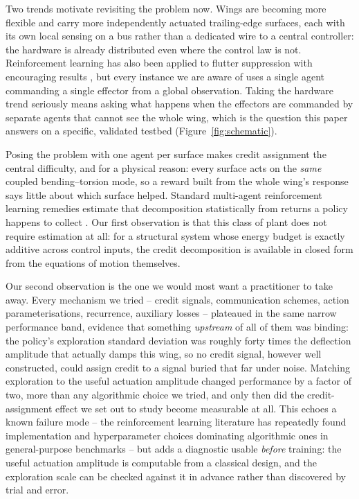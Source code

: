 \documentclass[journal]{new-aiaa}
\begin{document}
Two trends motivate revisiting the problem now. Wings are becoming more
flexible and carry more independently actuated trailing-edge surfaces, each
with its own local sensing on a bus rather than a dedicated wire to a
central controller: the hardware is already distributed even where the
control law is not. Reinforcement learning has also been applied to flutter
suppression with encouraging results
\cite{circulation2023,stallflutter2025,flyingwing2022}, but every instance
we are aware of uses a single agent commanding a single effector from a
global observation. Taking the hardware trend seriously means asking what
happens when the effectors are commanded by separate agents that cannot see
the whole wing, which is the question this paper answers on a specific,
validated testbed (Figure~\ref{fig:schematic}).

Posing the problem with one agent per surface makes credit assignment the
central difficulty, and for a physical reason: every surface acts on the
\emph{same} coupled bending--torsion mode, so a reward built from the whole
wing's response says little about which surface helped. Standard
multi-agent reinforcement learning remedies estimate that decomposition
statistically from returns a policy happens to collect
\cite{sunehag2018vdn,rashid2018qmix,foerster2018coma}. Our first observation
is that this class of plant does not require estimation at all: for a
structural system whose energy budget is exactly additive across control
inputs, the credit decomposition is available in closed form from the
equations of motion themselves.

Our second observation is the one we would most want a practitioner to take
away. Every mechanism we tried -- credit signals, communication schemes,
action parameterisations, recurrence, auxiliary losses -- plateaued in the
same narrow performance band, evidence that something \emph{upstream} of
all of them was binding: the policy's exploration standard deviation was
roughly forty times the deflection amplitude that actually damps this wing,
so no credit signal, however well constructed, could assign credit to a
signal buried that far under noise. Matching exploration to the useful
actuation amplitude changed performance by a factor of two, more than any
algorithmic choice we tried, and only then did the credit-assignment effect
we set out to study become measurable at all. This echoes a known failure
mode -- the reinforcement learning literature has repeatedly found
implementation and hyperparameter choices dominating algorithmic ones in
general-purpose benchmarks \cite{henderson2018matters,
engstrom2020implementation,andrychowicz2021what} -- but adds a diagnostic
usable \emph{before} training: the useful actuation amplitude is computable
from a classical design, and the exploration scale can be checked against
it in advance rather than discovered by trial and error.
\end{document}
